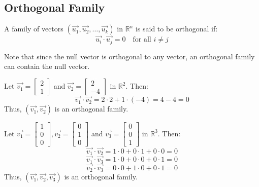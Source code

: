 \subsection{Orthogonal Family}
\begin{definition}
    A family of vectors $(\vec{u_1}, \vec{u_2}, \ldots, \vec{u_k})$ in $\mathbb{R}^n$ is said to be orthogonal if:
    \[
        \vec{u_i} \cdot \vec{u_j} = 0 \quad \text{for all } i \neq j
    \]
\end{definition}
Note that since the null vector is orthogonal to any vector, an orthogonal family can contain the null vector.

\begin{eg}
    Let $\vec{v_1} = \begin{bmatrix}
        2 \\ 1
    \end{bmatrix}$ and $\vec{v_2} = \begin{bmatrix}
        2 \\ -4
    \end{bmatrix}$ in $\mathbb{R}^2$. Then:
    \[
        \vec{v_1} \cdot \vec{v_2} = 2 \cdot 2 + 1 \cdot (-4) = 4 - 4 = 0
    \]
    Thus, $(\vec{v_1}, \vec{v_2})$ is an orthogonal family.
\end{eg}

\begin{eg}
    Let $\vec{v_1} = \begin{bmatrix}
        1 \\ 0 \\ 0
    \end{bmatrix}, \vec{v_2} = \begin{bmatrix}
        0 \\ 1 \\ 0
    \end{bmatrix}$ and $\vec{v_3} = \begin{bmatrix}
        0 \\ 0 \\ 1
    \end{bmatrix}$ in $\mathbb{R}^3$. Then:
    \[
        \vec{v_1} \cdot \vec{v_2} = 1 \cdot 0 + 0 \cdot 1 + 0 \cdot 0 = 0
    \]
    \[
        \vec{v_1} \cdot \vec{v_3} = 1 \cdot 0 + 0 \cdot 0 + 0 \cdot 1 = 0
    \]
    \[
        \vec{v_2} \cdot \vec{v_3} = 0 \cdot 0 + 1 \cdot 0 + 0 \cdot 1 = 0
    \]
    Thus, $(\vec{v_1}, \vec{v_2}, \vec{v_3})$ is an orthogonal family.
\end{eg}

